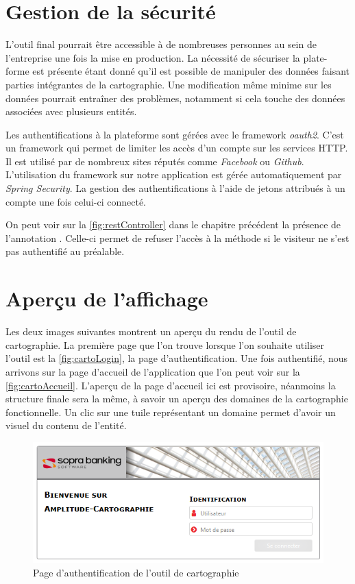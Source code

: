 \documentclass{polytech/polytech}
\begin{document}
\section{Gestion de la sécurité}

L'outil final pourrait être accessible à de nombreuses personnes au sein de l'entreprise une fois la mise en production. La nécessité de sécuriser la plate-forme est présente étant donné qu'il est possible de manipuler des données faisant parties intégrantes de la cartographie. Une modification même minime sur les données pourrait entraîner des problèmes, notamment si cela touche des données associées avec plusieurs entités.

Les authentifications à la plateforme sont gérées avec le framework \textit{oauth2}. C'est un framework qui permet de limiter les accès d'un compte sur les services HTTP. Il est utilisé par de nombreux sites réputés comme \textit{Facebook} ou \textit{Github}. L'utilisation du framework sur notre application est gérée automatiquement par \textit{Spring Security}. La gestion des authentifications à l'aide de jetons attribués à un compte une fois celui-ci connecté. 

On peut voir sur la \autoref{fig:restController} dans le chapitre précédent la présence de l'annotation . Celle-ci permet de refuser l'accès à la méthode si le visiteur ne s'est pas authentifié au préalable. 

\section{Aperçu de l'affichage}

Les deux images suivantes montrent un aperçu du rendu de l'outil de cartographie. La première page que l'on trouve lorsque l'on souhaite utiliser l'outil est la \autoref{fig:cartoLogin}, la page d'authentification. Une fois authentifié, nous arrivons sur la page d'accueil de l'application que l'on peut voir sur la \autoref{fig:cartoAccueil}. L'aperçu de la page d'accueil ici est provisoire, néanmoins la structure finale sera la même, à savoir un aperçu des domaines de la cartographie fonctionnelle. Un clic sur une tuile représentant un domaine permet d'avoir un visuel du contenu de l'entité. 

\begin{figure}
	\includegraphics[scale=0.8]{images/cartoLogin}
	\caption{Page d'authentification de l'outil de cartographie}
	\label{fig:cartoLogin}
\end{figure}
\end{document}
